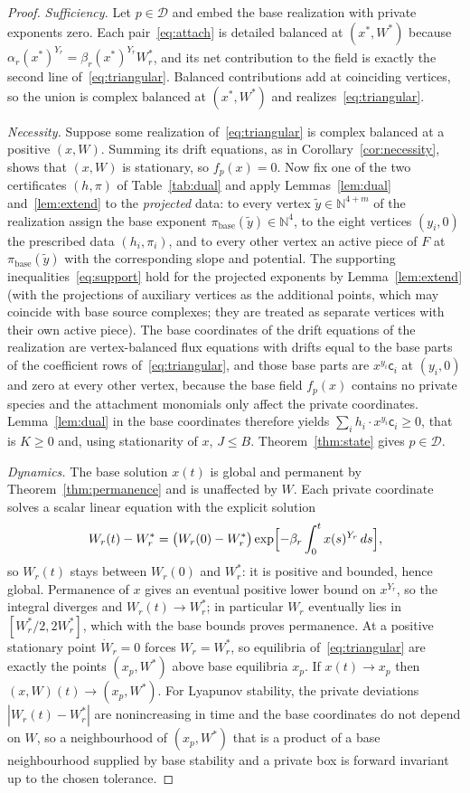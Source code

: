 \documentclass[11pt,a4paper]{article}
\theoremstyle{plain}
\theoremstyle{definition}
\theoremstyle{remark}
\newcommand{\N}{\mathbb{N}}
\newcommand{\DT}{\mathcal{D}}
\newcommand{\cc}{\mathsf{c}}
\newcommand{\xs}{x^{*}}
\begin{document}
\begin{proof}
\emph{Sufficiency.} Let $p\in\DT$ and embed the base realization with private exponents zero. Each pair~\eqref{eq:attach} is detailed balanced at $(\xs,W^*)$ because $\alpha_r(\xs)^{Y_r}=\beta_r(\xs)^{Y_r}W_r^*$, and its net contribution to the field is exactly the second line of~\eqref{eq:triangular}. Balanced contributions add at coinciding vertices, so the union is complex balanced at $(\xs,W^*)$ and realizes~\eqref{eq:triangular}.

\emph{Necessity.} Suppose some realization of~\eqref{eq:triangular} is complex balanced at a positive $(x,W)$. Summing its drift equations, as in Corollary~\ref{cor:necessity}, shows that $(x,W)$ is stationary, so $f_p(x)=0$. Now fix one of the two certificates $(h,\pi)$ of Table~\ref{tab:dual} and apply Lemmas~\ref{lem:dual} and~\ref{lem:extend} to the \emph{projected} data: to every vertex $\tilde y\in\N^{4+m}$ of the realization assign the base exponent $\pi_{\text{base}}(\tilde y)\in\N^4$, to the eight vertices $(y_i,0)$ the prescribed data $(h_i,\pi_i)$, and to every other vertex an active piece of $F$ at $\pi_{\text{base}}(\tilde y)$ with the corresponding slope and potential. The supporting inequalities~\eqref{eq:support} hold for the projected exponents by Lemma~\ref{lem:extend} (with the projections of auxiliary vertices as the additional points, which may coincide with base source complexes; they are treated as separate vertices with their own active piece). The base coordinates of the drift equations of the realization are vertex-balanced flux equations with drifts equal to the base parts of the coefficient rows of~\eqref{eq:triangular}, and those base parts are $x^{y_i}\cc_i$ at $(y_i,0)$ and zero at every other vertex, because the base field $f_p(x)$ contains no private species and the attachment monomials only affect the private coordinates. Lemma~\ref{lem:dual} in the base coordinates therefore yields $\sum_ih_i\cdot x^{y_i}\cc_i\ge0$, that is $K\ge0$ and, using stationarity of $x$, $J\le B$. Theorem~\ref{thm:state} gives $p\in\DT$.

\emph{Dynamics.} The base solution $x(t)$ is global and permanent by Theorem~\ref{thm:permanence} and is unaffected by $W$. Each private coordinate solves a scalar linear equation with the explicit solution
\[
W_r(t)-W_r^*=\bigl(W_r(0)-W_r^*\bigr)\exp\Bigl[-\beta_r\int_0^tx(s)^{Y_r}\,ds\Bigr],
\]
so $W_r(t)$ stays between $W_r(0)$ and $W_r^*$: it is positive and bounded, hence global. Permanence of $x$ gives an eventual positive lower bound on $x^{Y_r}$, so the integral diverges and $W_r(t)\to W_r^*$; in particular $W_r$ eventually lies in $[W_r^*/2,2W_r^*]$, which with the base bounds proves permanence. At a positive stationary point $\dot W_r=0$ forces $W_r=W_r^*$, so equilibria of~\eqref{eq:triangular} are exactly the points $(x_p,W^*)$ above base equilibria $x_p$. If $x(t)\to x_p$ then $(x,W)(t)\to(x_p,W^*)$. For Lyapunov stability, the private deviations $|W_r(t)-W_r^*|$ are nonincreasing in time and the base coordinates do not depend on $W$, so a neighbourhood of $(x_p,W^*)$ that is a product of a base neighbourhood supplied by base stability and a private box is forward invariant up to the chosen tolerance.
\end{proof}
\end{document}
